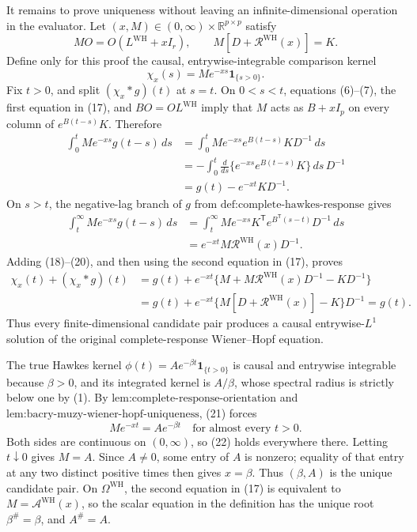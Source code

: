 It remains to prove uniqueness without leaving an infinite-dimensional operation in the evaluator.  Let \((x,M)\in(0,\infty)\times\mathbb R^{p\times p}\) satisfy
\[
 MO=O(L^{\mathrm{WH}}+xI_r),\qquad
 M[D+\mathcal R^{\mathrm{WH}}(x)]=K.
\tag{17}
\]
Define only for this proof the causal, entrywise-integrable comparison kernel
\[
 \chi_x(s)=Me^{-xs}\mathbf 1_{\{s>0\}}.
\tag{18}
\]
Fix \(t>0\), and split \((\chi_x*g)(t)\) at \(s=t\).  On \(0<s<t\), equations (6)--(7), the first equation in (17), and \(BO=OL^{\mathrm{WH}}\) imply that \(M\) acts as \(B+xI_p\) on every column of \(e^{B(t-s)}K\).  Therefore
\[
 \begin{aligned}
 \int_0^t Me^{-xs}g(t-s)\,ds
 &=\int_0^t Me^{-xs}e^{B(t-s)}K D^{-1}\,ds\\
 &=-\int_0^t\frac{d}{ds}
   \{e^{-xs}e^{B(t-s)}K\}\,ds\,D^{-1}\\
 &=g(t)-e^{-xt}KD^{-1}.
 \end{aligned}
\tag{19}
\]
On \(s>t\), the negative-lag branch of \(g\) from \(\text{def:complete-hawkes-response}\) gives
\[
 \begin{aligned}
 \int_t^\infty Me^{-xs}g(t-s)\,ds
 &=\int_t^\infty Me^{-xs}K^{\mathsf T}e^{B^{\mathsf T}(s-t)}D^{-1}\,ds\\
 &=e^{-xt}M\mathcal R^{\mathrm{WH}}(x)D^{-1}.
 \end{aligned}
\tag{20}
\]
Adding (18)--(20), and then using the second equation in (17), proves
\[
 \begin{aligned}
 \chi_x(t)+(\chi_x*g)(t)
 &=g(t)+e^{-xt}\{M+M\mathcal R^{\mathrm{WH}}(x)D^{-1}-KD^{-1}\}\\
 &=g(t)+e^{-xt}\{M[D+\mathcal R^{\mathrm{WH}}(x)]-K\}D^{-1}=g(t).
 \end{aligned}
\tag{21}
\]
Thus every finite-dimensional candidate pair produces a causal entrywise-\(L^1\) solution of the original complete-response Wiener--Hopf equation.

The true Hawkes kernel \(\phi(t)=Ae^{-\beta t}\mathbf 1_{\{t>0\}}\) is causal and entrywise integrable because \(\beta>0\), and its integrated kernel is \(A/\beta\), whose spectral radius is strictly below one by (1).  By \(\text{lem:complete-response-orientation}\) and \(\text{lem:bacry-muzy-wiener-hopf-uniqueness}\), (21) forces
\[
 Me^{-xt}=Ae^{-\beta t}\quad\text{for almost every }t>0.
\tag{22}
\]
Both sides are continuous on \((0,\infty)\), so (22) holds everywhere there.  Letting \(t\downarrow0\) gives \(M=A\).  Since \(A\neq0\), some entry of \(A\) is nonzero; equality of that entry at any two distinct positive times then gives \(x=\beta\).  Thus \((\beta,A)\) is the unique candidate pair.  On \(\Omega^{\mathrm{WH}}\), the second equation in (17) is equivalent to \(M=\mathcal A^{\mathrm{WH}}(x)\), so the scalar equation in the definition has the unique root \(\beta^{\#}=\beta\), and \(A^{\#}=A\).

